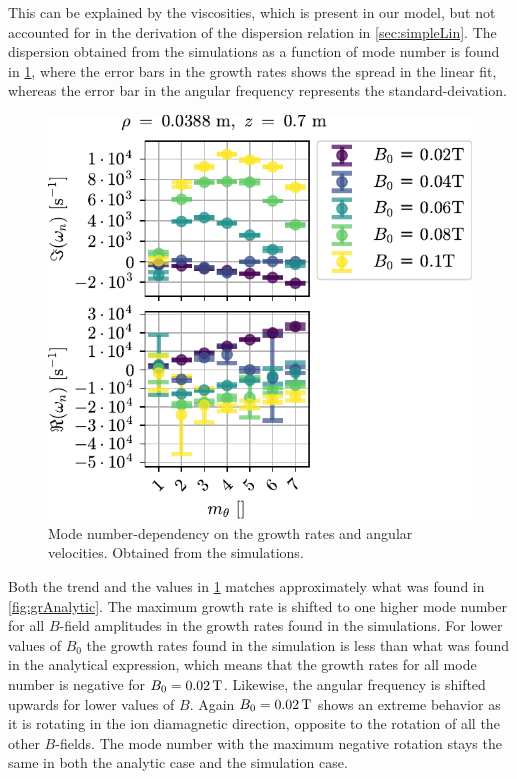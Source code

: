 %
This can be explained by the viscosities, which is present in our model, but not accounted for in the derivation of the dispersion relation in \cref{sec:simpleLin}.
The dispersion obtained from the simulations as a function of mode number is found in \cref{fig:grB}, where the error bars in the growth rates shows the spread in the linear fit, whereas the error bar in the angular frequency represents the standard-deivation.
%
\begin{figure}[htb]
        \centering
        \includegraphics{fig/results/growthRates/growthRatesB0}
        \caption{Mode number-dependency on the growth rates and angular velocities.
            Obtained from the simulations.}
        \label{fig:grB}
\end{figure}
%
Both the trend and the values in \cref{fig:grB} matches approximately what was found in \cref{fig:grAnalytic}.
The maximum growth rate is shifted to one higher mode number for all $B$-field amplitudes in the growth rates found in the simulations.
For lower values of $B_0$ the growth rates found in the simulation is less than what was found in the analytical expression, which means that the growth rates for all mode number is negative for $B_0=0.02\, \text{T}$.
Likewise, the angular frequency is shifted upwards for lower values of $B$.
Again $B_0=0.02\, \text{T}$ shows an extreme behavior as it is rotating in the ion diamagnetic direction, opposite to the rotation of all the other $B$-fields.
The mode number with the maximum negative rotation stays the same in both the analytic case and the simulation case.

